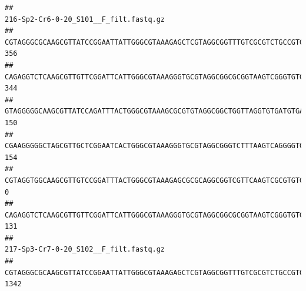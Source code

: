 \documentclass[]{article}
\begin{document}
\begin{verbatim}
##                                                                                                                                                                                                                                                           216-Sp2-Cr6-0-20_S101__F_filt.fastq.gz
## CGTAGGGCGCAAGCGTTATCCGGAATTATTGGGCGTAAAGAGCTCGTAGGCGGTTTGTCGCGTCTGCCGTGAAAGTCCGGGGCTCAACTCCGGATCTGCGGTGGGTACGGGCAGACTAGAGTGATGTAGGGGAGACTGGAATTCCTGGTGTAGCGGTGAAATGCGCAGATATCAGGAGGAACACCGATGGCGAAGGCAGGTCTCTGGGCATTAACTGACGCTGAGGAGCGAAAGCATGGGGAGCGAACA                                    356
## CAGAGGTCTCAAGCGTTGTTCGGATTCATTGGGCGTAAAGGGTGCGTAGGCGGCGCGGTAAGTCGGGTGTGAAATCTCGGAGCTTAACTCCGAAACTGCATTCGATACTGCCGTGCTTGAGGACTGGAGAGGAGACTGGAATTTACGGTGTAGCGGTGAAATGCGTAGATATCGTAAGGAAGACCAGTGGCGAAGGCGGGTCTCTGGACAGTTCCTGACGCTGAGGCACGAAGGCCAGGGGAGCAAACG                                    344
## GTAGGGGGCAAGCGTTATCCAGATTTACTGGGCGTAAAGCGCGTGTAGGCGGCTGGTTAGGTGTGATGTGAAATCTTCCGGCTCAACCGGAAAACTGCATTGCAAACCGGCCTGGCTAGAGTGCAGGAGAGGGAAGCGGAATTCCAGGTGTAGCGGTGAAATGCGTAGATATCTGGAGGAACACCAGTGGCGAAGGCGGCTTCCTGGCCTGCAACTGACGCTGAGACGCGAAAGCGTGGGGAGCGAAC                                     150
## CGAAGGGGGCTAGCGTTGCTCGGAATCACTGGGCGTAAAGGGTGCGTAGGCGGGTCTTTAAGTCAGGGGTGAAATCCTGGAGCTCAACTCCAGAACTGCCTTTGATACTGAAGATCTTGAGTTCGGGAGAGGTGAGTGGAACTGCGAGTGTAGAGGTGAAATTCGTAGATATTCGCAAGAACACCAGTGGCGAAGGCGGCTCACTGGCCCGATACTGACGCTGAGGCACGAAAGCGTGGGGAGCAAACA                                    154
## CGTAGGTGGCAAGCGTTGTCCGGATTTACTGGGCGTAAAGAGCGCGCAGGCGGTCGTTCAAGTCGCGTGTGAAAGCCCCCGGCTCAACTGGGGAGGGTCACGCGATACTGATCGACTCGAAGGCAGGAGAGGGTAGTGGAATTCCCGGTGTAGTGGTGAAATGCGTAGATATCGGGAGGAACACCAGTGGCGAAGGCGACTACCTGGCCTGTTCTTGACGCTGAGGCGCGAAAGCTAGGGGAGCAAACG                                      0
## CAGAGGTCTCAAGCGTTGTTCGGATTCATTGGGCGTAAAGGGTGCGTAGGCGGCGCGGTAAGTCGGGTGTGAAATCTCGGGGCTTAACTCCGAAACTGCATTCGATACTGCCGTGCTTGAGGACTGGAGAGGAGACTGGAATTTACGGTGTAGCGGTGAAATGCGTAGATATCGTAAGGAAGACCAGTGGCGAAGGCGGGTCTCTGGACAGTTCCTGACGCTGAGGCACGAAGGCCAGGGGAGCAAACG                                    131
##                                                                                                                                                                                                                                                           217-Sp3-Cr7-0-20_S102__F_filt.fastq.gz
## CGTAGGGCGCAAGCGTTATCCGGAATTATTGGGCGTAAAGAGCTCGTAGGCGGTTTGTCGCGTCTGCCGTGAAAGTCCGGGGCTCAACTCCGGATCTGCGGTGGGTACGGGCAGACTAGAGTGATGTAGGGGAGACTGGAATTCCTGGTGTAGCGGTGAAATGCGCAGATATCAGGAGGAACACCGATGGCGAAGGCAGGTCTCTGGGCATTAACTGACGCTGAGGAGCGAAAGCATGGGGAGCGAACA                                   1342

\end{verbatim}
\end{document}

